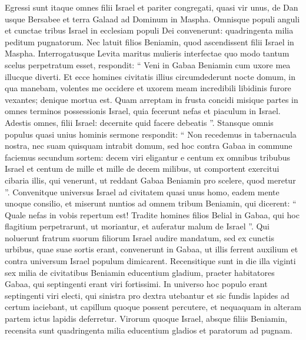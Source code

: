 \begin{biblechapter}
\begin{biblechapter}
\begin{biblechapter}
\begin{biblechapter}
\begin{biblechapter}
\begin{biblechapter}
\begin{biblechapter}
\begin{biblechapter}
\begin{biblechapter}
\begin{biblechapter}
\begin{biblechapter}
\begin{biblechapter}
\begin{biblechapter}
\begin{biblechapter}
\begin{biblechapter}
\begin{biblechapter}
\begin{biblechapter}
\begin{biblechapter}
\begin{biblechapter}
\begin{biblechapter}
\verse Egressi sunt itaque omnes filii Israel et pariter congregati, quasi vir unus, de Dan usque Bersabee et terra Galaad ad Dominum in Maspha. 
\verse Omnisque populi anguli et cunctae tribus Israel in ecclesiam populi Dei convenerunt: quadringenta milia peditum pugnatorum. 
\verse Nec latuit filios Beniamin, quod ascendissent filii Israel in Maspha. Interrogatusque Levita maritus mulieris interfectae quo modo tantum scelus perpetratum esset, 
\verse respondit: “ Veni in Gabaa Beniamin cum uxore mea illucque diverti. 
\verse Et ecce homines civitatis illius circumdederunt nocte domum, in qua manebam, volentes me occidere et uxorem meam incredibili libidinis furore vexantes; denique mortua est. 
\verse Quam arreptam in frusta concidi misique partes in omnes terminos possessionis Israel, quia fecerunt nefas et piaculum in Israel. 
\verse Adestis omnes, filii Israel: decernite quid facere debeatis ”.
 \verse Stansque omnis populus quasi unius hominis sermone respondit: “ Non recedemus in tabernacula nostra, nec suam quisquam intrabit domum, 
\verse sed hoc contra Gabaa in commune faciemus secundum sortem: 
\verse decem viri eligantur e centum ex omnibus tribubus Israel et centum de mille et mille de decem milibus, ut comportent exercitui cibaria illis, qui venerunt, ut reddant Gabaa Beniamin pro scelere, quod meretur ”. 
\verse Convenitque universus Israel ad civitatem quasi unus homo, eadem mente unoque consilio, 
\verse et miserunt nuntios ad omnem tribum Beniamin, qui dicerent: “ Quale nefas in vobis repertum est! 
\verse Tradite homines filios Belial in Gabaa, qui hoc flagitium perpetrarunt, ut moriantur, et auferatur malum de Israel ”.
 Qui noluerunt fratrum suorum filiorum Israel audire mandatum, 
\verse sed ex cunctis urbibus, quae suae sortis erant, convenerunt in Gabaa, ut illis ferrent auxilium et contra universum Israel populum dimicarent. 
\verse Recensitique sunt in die illa viginti sex milia de civitatibus Beniamin educentium gladium, praeter habitatores Gabaa, qui septingenti erant viri fortissimi. 
\verse In universo hoc populo erant septingenti viri electi, qui sinistra pro dextra utebantur et sic fundis lapides ad certum iaciebant, ut capillum quoque possent percutere, et nequaquam in alteram partem ictus lapidis deferretur.
 \verse Virorum quoque Israel, absque filiis Beniamin, recensita sunt quadringenta milia educentium gladios et paratorum ad pugnam. 

\end{biblechapter}
\end{biblechapter}
\end{biblechapter}
\end{biblechapter}
\end{biblechapter}
\end{biblechapter}
\end{biblechapter}
\end{biblechapter}
\end{biblechapter}
\end{biblechapter}
\end{biblechapter}
\end{biblechapter}
\end{biblechapter}
\end{biblechapter}
\end{biblechapter}
\end{biblechapter}
\end{biblechapter}
\end{biblechapter}
\end{biblechapter}
\end{biblechapter}
